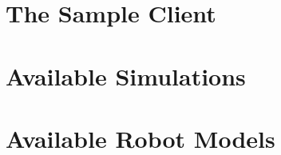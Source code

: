 
\section{The Sample Client}




\section{Available Simulations}

\section{Available Robot Models}


